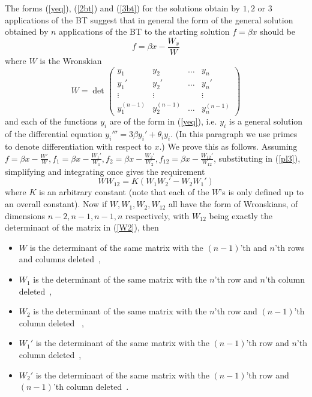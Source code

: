 \documentclass[12pt]{article}
\begin{document}

The forms (\ref{yeq}), (\ref{2bt}) and (\ref{3bt}) for the solutions obtain by $1,2$ or $3$ applications of the
BT suggest  that in general the form of the general solution obtained by $n$ applications of the BT to the starting
solution $f = \beta x$ 
should be
\begin{equation}
  f = \beta x- \frac{W_x}{W} \label{W}\end{equation}
where $W$ is the Wronskian
\begin{equation}
  W  = \det \left(
\begin{array}{cccc}
  y_1  & y_2  &   \ldots &  y_n  \\
  y_1'  & y_2'  &   \ldots &  y_n'  \\
  \vdots &   \vdots &  &   \vdots   \\
    y_1^{(n-1)}  & y_2^{(n-1)}  &   \ldots &  y_n^{(n-1)}  
\end{array}
\right) \label{W2}\end{equation}
and each of the functions $y_i$ are of the form in (\ref{yeq}), i.e. $y_i$ is a general solution of the
differential equation $y_i''' = 3 \beta y_i' + \theta_i y_i$. (In this paragraph we use primes to denote
differentiation with respect to $x$.) We prove this as follows. Assuming
$f=\beta x-\frac{W'}{W},
f_1=\beta x-\frac{W_1'}{W_1}, 
f_2=\beta x-\frac{W_2'}{W_2}, 
f_{12}= \beta x-\frac{W_{12}'}{W_{12}}$, 
substituting in (\ref{pl3}), simplifying and integrating once gives the requirement 
$$
W W_{12} = K ( W_1 W_2' - W_2 W_1' ) 
$$
where $K$ is an arbitrary constant (note that each of the $W$'s is only defined up to an overall constant). 
Now if $W,W_1,W_2,W_{12}$ all have the form of Wronskians, of dimensions $n-2,n-1,n-1,n$ respectively,
with $W_{12}$ being exactly the determinant of the matrix in (\ref{W2}), then
\begin{itemize}
\item $W$ is the determinant of the same matrix with the $(n-1)$'th and $n$'th rows and columns deleted\ ,
\item $W_1$ is the determinant of the same matrix with the  $n$'th row and $n$'th column deleted\ ,
\item $W_2$ is the determinant of the same matrix with the  $n$'th row and $(n-1)$'th column deleted \ ,
\item $W_1'$ is the determinant of the same matrix with the $(n-1)$'th row and $n$'th column deleted\ ,
\item $W_2'$ is the determinant of the same matrix with the $(n-1)$'th row and $(n-1)$'th column deleted\ .
\end{itemize}
\end{document}
